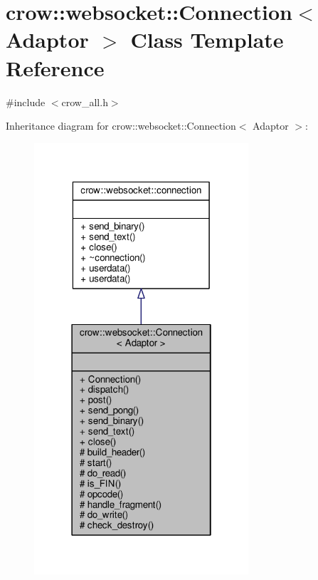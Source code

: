 \hypertarget{classcrow_1_1websocket_1_1_connection}{\section{crow\-:\-:websocket\-:\-:Connection$<$ Adaptor $>$ Class Template Reference}
\label{classcrow_1_1websocket_1_1_connection}
}


{\ttfamily \#include $<$crow\-\_\-all.\-h$>$}



Inheritance diagram for crow\-:\-:websocket\-:\-:Connection$<$ Adaptor $>$\-:
\nopagebreak
\begin{figure}[H]
\begin{center}
\leavevmode
\includegraphics[width=226pt]{classcrow_1_1websocket_1_1_connection__inherit__graph}
\end{center}
\end{figure}


